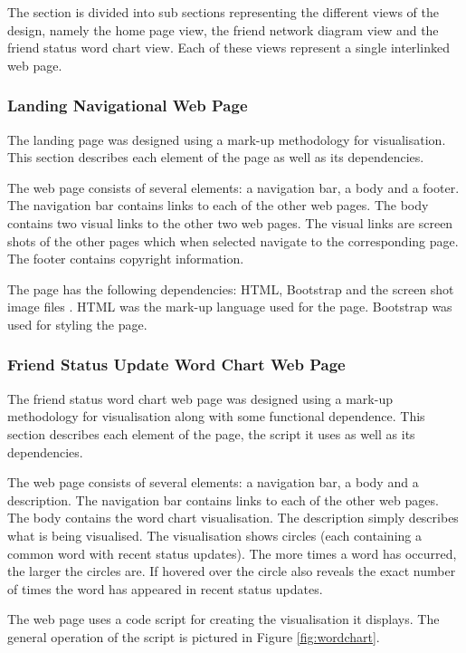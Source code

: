\documentclass[12pt,onecolumn]{article}
\begin{document}
	The section is divided into sub sections representing the different views of the design, namely the home page view, the friend network diagram view and the friend status word chart view. Each of these views represent a single interlinked web page.
	
	\subsubsection{Landing Navigational Web Page}
	The landing page was designed using a mark-up methodology for visualisation. This section describes each element of the page as well as its dependencies.
	
	The web page consists of several elements: a navigation bar, a body and a footer. The navigation bar contains links to each of the other web pages. The body contains two visual links to the other two web pages. The visual links are screen shots of the other pages which when selected navigate to the corresponding page. The footer contains copyright information.
	
	The page has the following dependencies: HTML, Bootstrap and the screen shot image files \cite{HTML, Bootstrap}. HTML was the mark-up language used for the page. Bootstrap was used for styling the page.
	
	\subsubsection{Friend Status Update Word Chart Web Page}
	The friend status word chart web page was designed using a mark-up methodology for visualisation along with some functional dependence. This section describes each element of the page, the script it uses as well as its dependencies.
		
	The web page consists of several elements: a navigation bar, a body and a description. The navigation bar contains links to each of the other web pages. The body contains the word chart visualisation. The description simply describes what is being visualised. The visualisation shows circles (each containing a common word with recent status updates). The more times a word has occurred, the larger the circles are. If hovered over the circle also reveals the exact number of times the word has appeared in recent status updates.
	
	The web page uses a code script for creating the visualisation it displays.  The general operation of the script is pictured in Figure \ref{fig:wordchart}.
	
\end{document}
